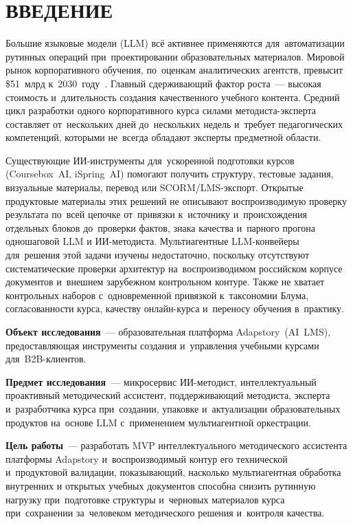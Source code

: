 \chapter*{ВВЕДЕНИЕ}
\sloppy

Большие языковые модели (LLM) всё активнее применяются для~автоматизации
рутинных операций при~проектировании образовательных материалов.
Мировой рынок корпоративного обучения, по~оценкам аналитических агентств,
превысит \$51~млрд к~2030~году~\cite{edtech_market_report_2024}.
Главный сдерживающий фактор роста~— высокая стоимость
и~длительность создания качественного учебного контента.
Средний цикл разработки одного корпоративного курса силами методиста-эксперта
составляет от~нескольких дней до~нескольких недель и~требует педагогических
компетенций, которыми не~всегда обладают эксперты предметной области.

Существующие ИИ-инструменты для~ускоренной подготовки курсов
(Coursebox~AI, iSpring~AI) помогают получить структуру,
тестовые задания, визуальные материалы, перевод или SCORM/LMS-экспорт.
Открытые продуктовые материалы этих решений не описывают воспроизводимую
проверку результата по~всей цепочке от~привязки к~источнику
и~происхождения отдельных блоков до~проверки фактов, знака качества
и~парного прогона одношаговой LLM и ИИ-методиста.
Мультиагентные LLM-конвейеры для~решения этой задачи
изучены недостаточно, поскольку отсутствуют систематические проверки архитектур
на~воспроизводимом российском корпусе документов и~внешнем зарубежном контрольном контуре.
Также не хватает контрольных наборов с~одновременной привязкой к~таксономии Блума, согласованности курса,
качеству онлайн-курса и~переносу обучения в~практику.

\textbf{Объект исследования}~— образовательная платформа Adapstory~(AI~LMS),
предоставляющая инструменты создания и~управления учебными курсами
для~B2B-клиентов.

\textbf{Предмет исследования}~— микросервис ИИ-методист,
интеллектуальный проактивный методический ассистент, поддерживающий
методиста, эксперта и~разработчика курса при~создании, упаковке и~актуализации
образовательных продуктов на~основе LLM с~применением мультиагентной
оркестрации.

\textbf{Цель работы}~— разработать MVP интеллектуального
методического ассистента платформы Adapstory и~воспроизводимый контур
его технической и~продуктовой валидации, показывающий, насколько
мультиагентная обработка внутренних и открытых учебных документов способна снизить
рутинную нагрузку при~подготовке структуры и~черновых материалов
курса при~сохранении за~человеком методического решения и~контроля
качества.

